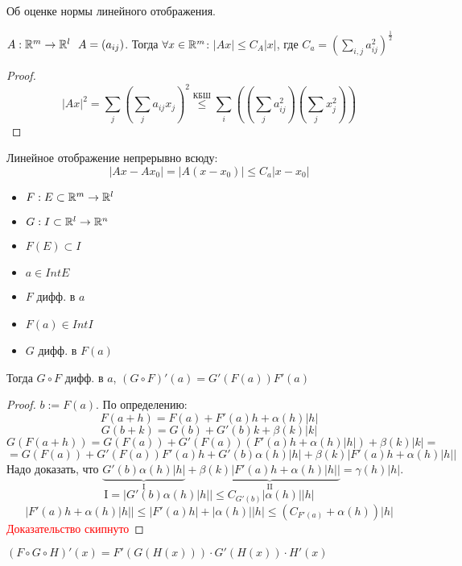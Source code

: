 \begin{lemma}
    Об оценке нормы линейного отображения.

    $A:\mathbb{R}^m \to \mathbb{R}^l \ \ A=(a_{ij})$. Тогда $\forall x\in\mathbb{R}^m$: $|Ax|\le C_A|x|$, где $C_a=\left(\sum\limits_{i, j} a_{ij}^2\right)^{\frac{1}{2}}$
\end{lemma}
\begin{proof}
    $$|Ax|^2 = \sum_{j}\left(\sum_j a_{ij}x_j\right)^2 \stackrel{\text{КБШ}}{\le} \sum_i\left(\left(\sum_j a_{ij}^2\right)\left(\sum_j x_{j}^2\right)\right)$$
\end{proof}

\begin{consequence}
    Линейное отображение непрерывно всюду:
    $$|Ax-Ax_0|=|A(x-x_0)|\le C_a|x-x_0|$$
\end{consequence}

\begin{theorem}
    \begin{itemize}[itemsep=1mm, after=\vspace{5mm}]
        \item $F:E\subset\mathbb{R}^m\to\mathbb{R}^l$
        \item $G:I\subset\mathbb{R}^l\to\mathbb{R}^n$
        \item $F(E)\subset I$
        \item $a\in Int E$
        \item $F$ дифф. в $a$
        \item $F(a)\in Int I$
        \item $G$ дифф. в $F(a)$
    \end{itemize}

    Тогда $G\circ F$ дифф. в $a$, $(G\circ F)'(a)=G'(F(a))F'(a)$
\end{theorem}
\begin{proof}
    $b:=F(a)$. По определению:
    $$F(a+h)=F(a) + F'(a)h + \alpha(h)|h|$$
    $$G(b+k)=G(b) + G'(b)k + \beta(k)|k|$$
    $$G(F(a+h))=G(F(a))+G'(F(a))(F'(a)h+\alpha(h)|h|)+\beta(k)|k|=$$
    $$=G(F(a))+G'(F(a))F'(a)h+G'(b)\alpha(h)|h|+\beta(k)|F'(a)h+\alpha(h)|h||$$
    Надо доказать, что $\underbrace{G'(b)\alpha(h)|h|}_{\text{I}}+\underbrace{\beta(k)|F'(a)h+\alpha(h)|h||}_{\text{II}}=\gamma(h)|h|$.
    $$\text{I}=|G'(b)\alpha(h)|h||\le C_{G'(b)} |\alpha(h)||h|$$
    $$|F'(a)h+\alpha(h)|h||\le |F'(a)h|+|\alpha(h)||h|\le (C_{F'(a)}+\alpha(h))|h|$$
    \textcolor{red}{Доказательство скипнуто}
\end{proof}

\begin{remark}
    $(F\circ G\circ H)'(x) = F'(G(H(x)))\cdot G'(H(x)) \cdot H'(x)$
\end{remark}

